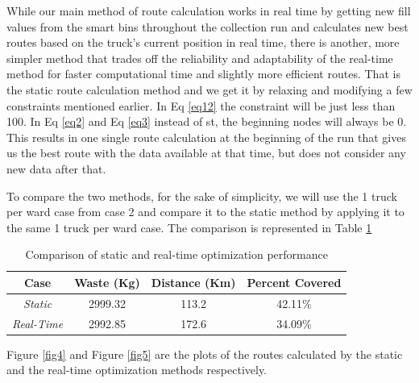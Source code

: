 \documentclass[12pt]{article}
\begin{document}
While our main method of route calculation works in real time by getting new fill values from the smart bins throughout the collection run and calculates new best routes based on the truck's current position in real time, there is another, more simpler method that trades off the reliability and adaptability of the real-time method for faster computational time and slightly more efficient routes. That is the static route calculation method and we get it by relaxing and modifying a few constraints mentioned earlier. In Eq \eqref{eq12} the constraint will be just less than 100. In Eq \eqref{eq2} and Eq \eqref{eq3} instead of st, the beginning nodes will always be 0. This results in one single route calculation at the beginning of the run that gives us the best route with the data available at that time, but does not consider any new data after that.

To compare the two methods, for the sake of simplicity, we will use the 1 truck per ward case from case 2 and compare it to the static method by applying it to the same 1 truck per ward case. The comparison is represented in Table \ref{tab5}

\begin{table}[H]
    \centering
    \caption{Comparison of static and real-time optimization performance} \label{tab5}
    \vspace*{0.3cm}
    \begin{tabular}{|c|c|c|c|}
        \hline Case & Waste (Kg) & Distance (Km) & Percent Covered\\
        \hline \textit{Static}& 2999.32& 113.2 & 42.11\%\\
        \hline \textit{Real-Time}& 2992.85& 172.6& 34.09\%\\
        \hline
    \end{tabular}
\end{table}

Figure \ref{fig4} and Figure \ref{fig5} are the plots of the routes calculated by the static and the real-time optimization methods respectively.
\end{document}
